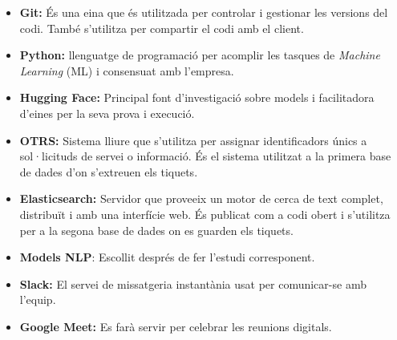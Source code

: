 \begin{itemize}
    \item \textbf{Git:} És una eina que és utilitzada per controlar i gestionar les versions del codi. També s'utilitza per compartir el codi amb el client.
    \item \textbf{Python:} llenguatge de programació per acomplir les tasques de \textit{Machine Learning} (ML) i consensuat amb l'empresa.
    \item \textbf{Hugging Face:} Principal font d'investigació sobre models i facilitadora d'eines per la seva prova i execució.
    \item \textbf{OTRS:} Sistema lliure que s'utilitza per assignar identificadors únics a sol·licituds de servei o informació. És el sistema utilitzat a la primera base de dades d'on s'extreuen els tiquets.
    \item \textbf{Elasticsearch:} Servidor que proveeix un motor de cerca de text complet, distribuït i amb una interfície web. És publicat com a codi obert i s'utilitza per a la segona base de dades on es guarden els tiquets.
    \item \textbf{Models NLP\cite{BERT}\cite{RoBERTaA}\cite{GPT2}}: Escollit després de fer l'estudi corresponent.
    \item \textbf{Slack:} El servei de missatgeria instantània usat per comunicar-se amb l'equip.
    \item \textbf{Google Meet:} Es farà servir per celebrar les reunions digitals.
\end{itemize}